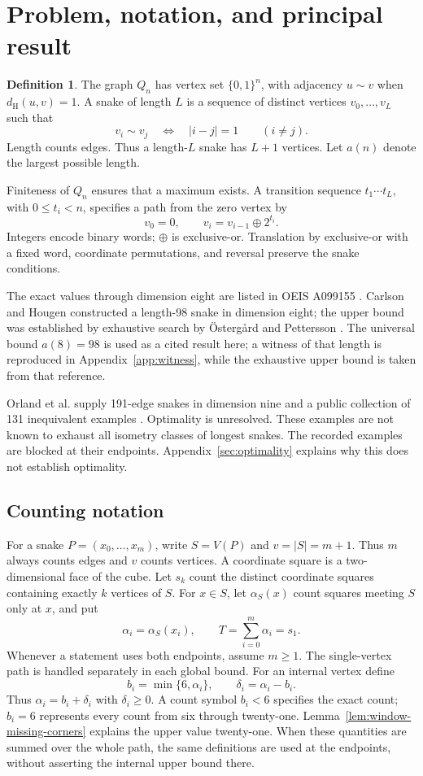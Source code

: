 \documentclass[11pt,a4paper]{article}
\theoremstyle{definition}
\newtheorem{definition}[theorem]{Definition}
\theoremstyle{remark}
\newcommand{\Q}{Q}
\newcommand{\Ham}{d_{\mathrm H}}
\begin{document}
\clearpage
\setcounter{tocdepth}{1}
\tableofcontents
\clearpage

\section{Problem, notation, and principal result}\label{sec:problem}
\begin{definition}
The graph $\Q_n$ has vertex set $\{0,1\}^n$, with adjacency $u\sim v$ when $\Ham(u,v)=1$. A snake of length $L$ is a sequence of distinct vertices $v_0,\ldots,v_L$ such that
\[
v_i\sim v_j\quad\Longleftrightarrow\quad |i-j|=1\qquad(i\ne j).
\]
Length counts edges. Thus a length-$L$ snake has $L+1$ vertices. Let $a(n)$ denote the largest possible length.
\end{definition}
Finiteness of $\Q_n$ ensures that a maximum exists. A transition sequence $t_1\cdots t_L$, with $0\le t_i<n$, specifies a path from the zero vertex by
\[
v_0=0,\qquad v_i=v_{i-1}\mathbin{\oplus}2^{t_i}.
\]
Integers encode binary words; $\oplus$ is exclusive-or. Translation by exclusive-or with a fixed word, coordinate permutations, and reversal preserve the snake conditions.

The exact values through dimension eight are listed in OEIS A099155 \cite{oeis}. Carlson and Hougen constructed a length-98 snake in dimension eight; the upper bound was established by exhaustive search by Östergård and Pettersson \cite{ostergard}. The universal bound $a(8)=98$ is used as a cited result here; a witness of that length is reproduced in Appendix~\ref{app:witness}, while the exhaustive upper bound is taken from that reference.

Orland et al. supply 191-edge snakes in dimension nine and a public collection of 131 inequivalent examples \cite{orland,data}. Optimality is unresolved. These examples are not known to exhaust all isometry classes of longest snakes. The recorded examples are blocked at their endpoints. Appendix~\ref{sec:optimality} explains why this does not establish optimality.

\subsection{Counting notation}
For a snake $P=(x_0,\ldots,x_m)$, write $S=V(P)$ and $v=|S|=m+1$. Thus $m$ always counts edges and $v$ counts vertices. A coordinate square is a two-dimensional face of the cube. Let $s_k$ count the distinct coordinate squares containing exactly $k$ vertices of $S$. For $x\in S$, let $\alpha_S(x)$ count squares meeting $S$ only at $x$, and put
\[
\alpha_i=\alpha_S(x_i),\qquad T=\sum_{i=0}^{m}\alpha_i=s_1.
\]
Whenever a statement uses both endpoints, assume $m\ge1$. The single-vertex path is handled separately in each global bound.
For an internal vertex define
\[
b_i=\min\{6,\alpha_i\},\qquad \delta_i=\alpha_i-b_i.
\]
Thus $\alpha_i=b_i+\delta_i$ with $\delta_i\ge0$. A count symbol $b_i<6$ specifies the exact count; $b_i=6$ represents every count from six through twenty-one. Lemma~\ref{lem:window-missing-corners} explains the upper value twenty-one. When these quantities are summed over the whole path, the same definitions are used at the endpoints, without asserting the internal upper bound there.
\end{document}
